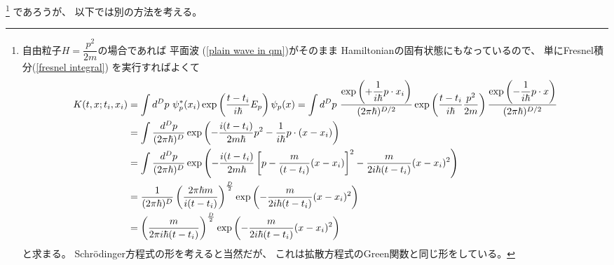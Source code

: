 \footnote{
    自由粒子$H = \dfrac{p^2}{2m}$の場合であれば
    平面波
    (\ref{plain wave in qm})がそのまま
    Hamiltonianの固有状態にもなっているので、
    単にFresnel積分(\ref{fresnel integral})
    を実行すればよくて
    \begin{align}
        K( t, \bm{x} ; t_i, \bm{x}_i )
    &=
        \int d^D p\ 
        \psi_p^*( \bm{x}_i )
        \exp\left(
            \dfrac{ t - t_i }{ i\hbar }
            E_p
        \right)
        \psi_p( \bm{x} )
    =
        \int d^D p\ 
        \dfrac{
            \exp\left(
                +
                \dfrac{1}{i\hbar}
                \bm{p} \cdot \bm{x}_i
            \right)
        }{ (2 \pi \hbar)^{D/2} }
            \exp\left(
            \dfrac{ t - t_i }{ i\hbar }
            \dfrac{ \bm{p}^2 }{ 2m }
        \right)
        \dfrac{
            \exp\left(
                -
                \dfrac{1}{i\hbar}
                \bm{p} \cdot \bm{x}
            \right)
        }{ (2 \pi \hbar)^{D/2} }
    \notag\\&=
        \int 
        \dfrac{
            d^D p
        }{ (2 \pi \hbar)^{D} }
            \exp\left(
                -
                \dfrac{ i ( t - t_i ) }{ 2 m \hbar }
                \bm{p}^2
            -
                \dfrac{1}{i\hbar}
                \bm{p} \cdot (\bm{x} - \bm{x}_i)
            \right)
    \notag\\&=
        \int 
        \dfrac{
            d^D p
        }{ (2 \pi \hbar)^{D} }
            \exp\left(
                -
                \dfrac{ i ( t - t_i ) }{ 2 m \hbar }
                \left[
                    \bm{p}
                -
                    \dfrac{ m }{ ( t - t_i ) }
                    (\bm{x} - \bm{x}_i)
                \right]^2
                -
                \dfrac{ m }{ 2 i \hbar (t - t_i) }
                (\bm{x} - \bm{x}_i)^2
            \right)
    \notag\\&=
        \dfrac{ 1 }{ (2 \pi \hbar)^{D} }
        \left(
            \dfrac{ 2 \pi \hbar m }{ i ( t - t_i ) }
        \right)^{\frac{D}{2}}
        \exp\left(
            -
            \dfrac{ m }{ 2 i \hbar (t - t_i) }
            (\bm{x} - \bm{x}_i)^2
        \right)
    \notag\\&=
        \left(
            \dfrac{ m }{ 2 \pi i \hbar ( t - t_i ) }
        \right)^{\frac{D}{2}}
        \exp\left(
            -
            \dfrac{ m }{ 2 i \hbar (t - t_i) }
            (\bm{x} - \bm{x}_i)^2
        \right)
    \label{feynman kernel for free particle}
    \end{align}
    と求まる。
    Schr\"odinger方程式の形を考えると当然だが、
    これは拡散方程式のGreen関数と同じ形をしている。
}
であろうが、
以下では別の方法を考える。

